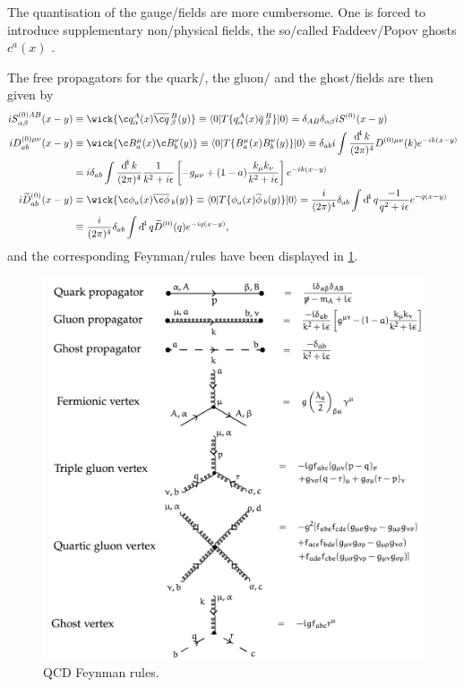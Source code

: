 \documentclass[../../index.tex]{subfiles}
\begin{document}
The quantisation of the gauge\-/fields are more cumbersome. One is forced to
introduce supplementary non\-/physical fields, the so\-/called Faddeev\-/Popov
ghosts $c^a(x)$ \cite{Faddeev1967}.

The free propagators for the quark\-/, the gluon\-/ and the ghost\-/fields are
then given by
\begin{equation}
  \begin{split}
    i S^{(0)AB}_{\alpha\beta}(x-y) &\equiv \wick{ \c q_\alpha^A(x) \anti{\c
        q}_\beta^B(y)} \equiv \langle 0 \vert T \{ q_\alpha^A(x)
    \anti{q}_\beta^B \} \vert 0 \rangle
    = \delta_{AB} \delta_{\alpha\beta} i S^{(0)}(x-y) \\
    i D^{(0)\mu\nu}_{ab}(x-y) &\equiv \wick{ \c B_a^\mu(x) \c B_b^\nu(y)} \equiv
    \langle 0 \vert T \{ B_a^\mu(x) B_b^\nu(y) \} \vert 0 \rangle
    \equiv \delta_{ab}i \int \frac{\dif^4 k}{(2\pi)^4} D^{(0)\mu\nu}(k) e^{-ik(x-y)} \\
    &= i \delta_{ab} \int \frac{\dif^4 k}{(2\pi)^4} \frac{1}{k^2+i\epsilon} \left[ -g_{\mu\nu} + (1-a) \frac{k_\mu k_\nu}{k^2+i\epsilon} \right] e^{-ik(x-y)} \\
    i \widetilde{D}_{ab}^{(0)}(x-y) & \equiv \wick{\c \phi_a(x) \anti{\c
        \phi}_b(y)} \equiv \langle 0 \vert T\{ \phi_a(x) \anti{\phi}_b(y) \}
    \vert 0 \rangle
    = \frac{i}{(2\pi)^4}\delta_{ab} \int \dif^4 q \frac{-1}{q^2 + i\epsilon} e^{-q(x-y)} \\
    &\equiv \frac{i}{(2\pi)^4} \delta_{ab} \int \dif^4 q \widetilde{D}^{(0)}(q)
    e^{-iq(x-y)},
  \end{split}
\end{equation}
and the corresponding Feynman\-/rules have been displayed in \cref{fig:qcdFeynmanRules}.
\begin{figure}
  \includegraphics[width=\textwidth]{./images/qcdFeynmanRules.png}
  \caption{QCD Feynman rules.}
  \label{fig:qcdFeynmanRules}
\end{figure}
\end{document}
